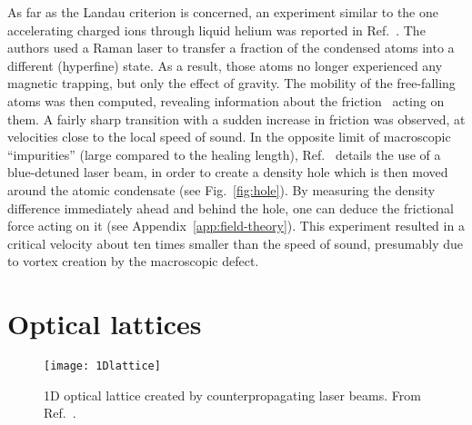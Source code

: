 % 
As far as the Landau criterion is concerned, an experiment similar to
the one accelerating charged ions through liquid helium was reported
in Ref.~\cite{Chikkatur_2000}. The authors used a Raman laser to
transfer a fraction of the condensed atoms into a different
(hyperfine) state. As a result, those atoms no longer experienced any
magnetic trapping, but only the effect of gravity. The mobility of the
free-falling atoms was then computed, revealing information about the
friction~\cite{Astrakharchik_2004} acting on them.  A fairly sharp
transition with a sudden increase in friction was observed, at
velocities close to the local speed of sound.
%
In the opposite limit of macroscopic ``impurities'' (large compared to
the healing length), Ref.~\cite{Onofrio_2000} details the use of a
blue-detuned laser beam, in order to create a density hole which is
then moved around the atomic condensate (see Fig.~\ref{fig:hole}).  By
measuring the density difference immediately ahead and behind the
hole, one can deduce the frictional force acting on it (see
Appendix~\ref{app:field-theory}). This experiment resulted in a
critical velocity about ten times smaller than the speed of sound,
presumably due to vortex creation by the macroscopic defect.


\section{Optical lattices}
\label{sec:optical-lattice}
%
\begin{figure}[tb]\centering
  \texttt{[image: 1Dlattice]}
  \caption{
    1D optical lattice created by counterpropagating laser beams. From Ref.~\cite{RevModPhys.78.179}.
  }\label{fig:label}
\end{figure}
% 


